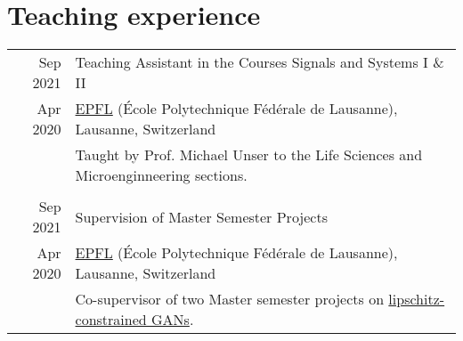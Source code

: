 \section{Teaching experience}

\begin{tabular}{r|p{13cm}}

    {\small Sep 2021} & Teaching Assistant in the Courses Signals and Systems I \& II \\[\datespace]
    {\small Apr 2020} & \small{\href{https://www.epfl.ch/en/}{EPFL} (École Polytechnique Fédérale de Lausanne), Lausanne, Switzerland} \\[\title-main-sep]
& {\footnotesize Taught by Prof. Michael Unser to the Life Sciences and Microenginneering sections.} \\

\multicolumn{2}{c}{} \\

{\small Sep 2021} & Supervision of Master Semester Projects \\[\datespace]
{\small Apr 2020} & \small{\href{https://www.epfl.ch/en/}{EPFL} (École Polytechnique Fédérale de Lausanne), Lausanne, Switzerland} \\[\title-main-sep]
& \footnotesize{Co-supervisor of two Master semester projects on \href{https://bigwww.epfl.ch/teaching/projects/abstract.html?f=00388}{lipschitz-constrained GANs}.} \\

\end{tabular}

